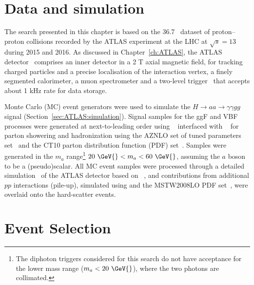 \FloatBarrier
\section{Data and simulation}
The search presented in this chapter is based on the 36.7~\ifb{} dataset of proton--proton collisions
recorded by the ATLAS experiment at the LHC at $\sqrt{s}=13$ \TeV{} during 2015 and 2016.
As discussed in Chapter~\ref{ch:ATLAS}, the ATLAS detector~\cite{PERF-2007-01} comprises an inner detector in a 2 T axial magnetic field, 
for tracking charged particles and a precise localisation of the interaction vertex, 
a finely segmented calorimeter, a muon spectrometer and a two-level trigger~\cite{TRIG-2016-01} that
accepts about 1 kHz rate for data storage.

Monte Carlo (MC) event generators were used to simulate the $H\to aa \to \gamma\gamma gg$ signal (Section~\ref{sec:ATLAS:simulation}).
Signal samples for the ggF and VBF processes were generated at next-to-leading order using 
\POWHEGBOX{}~\cite{Nason:2004rx,Frixione:2007vw,Alioli:2010xd} interfaced with \PYTHIA{}~\cite{Sjostrand:2014zea} for parton showering and hadronization using the AZNLO set of tuned parameters set~\cite{STDM-2012-23} and the CT10 parton distribution function (PDF) set~\cite{Lai:2010vv}.
Samples were generated in the $m_a$ range\footnote{The diphoton triggers considered for this
search do not have acceptance for the lower mass range ($m_a<20~\GeV{}$), where the two photons are collimated.} 
$20~\GeV{} < m_a < 60~\GeV{}$, assuming the $a$ boson to be a (pseudo)scalar.
All MC event samples were processed through a detailed simulation~\cite{SOFT-2010-01} of the ATLAS detector
based on \geantFour{}~\cite{Agostinelli:2002hh}, and contributions from additional $pp$ interactions (pile-up), simulated using
\PYTHIA{} and the MSTW2008LO PDF set~\cite{Martin:2009iq}, were overlaid onto the hard-scatter events.

\section{Event Selection}

